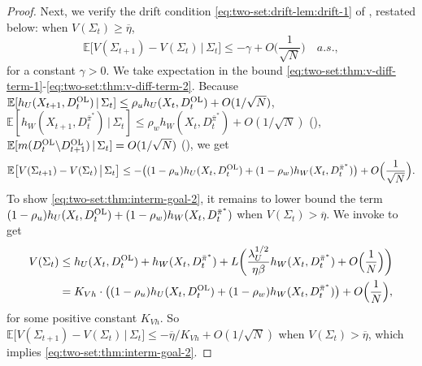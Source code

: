 \documentclass[11pt,letterpaper]{article}
\theoremstyle{plain}
\theoremstyle{definition}
\theoremstyle{remark}
\newcommand{\Eplain}[1]{\mathbb{E}[#1]}
\newcommand{\Ebig}[1]{\mathbb{E}\big[#1\big]}
\newcommand{\givenplain}{\,|\,}
\newcommand{\givenbig}{\,\big|\,}
\newcommand{\pibar}{{\sysbar{\pi}}}
\newcommand{\pibs}{{\pibar^*}}
\newcommand{\sysbar}[1]{\bar{#1}}
\newcommand{\threshbar}{\overline{\eta}}
\newcommand{\wmat}{W}
\newcommand{\umat}{U}
\newcommand{\hw}{h_\wmat}
\newcommand{\hu}{h_\umat}
\newcommand{\lamu}{\lambda_\umat}
\newcommand{\rhow}{\rho_{w}}
\newcommand{\rhou}{\rho_{u}}
\newcommand{\Da}{D^{\pibs}}
\newcommand{\Db}{D^{\textup{OL}}}
\newcommand{\Fullstate}{\Sigma}
\begin{document}
\begin{proof}
Next, we verify the drift condition \eqref{eq:two-set:drift-lem:drift-1} of , restated below: when $V(\Fullstate_t)\geq \threshbar$, 
\begin{equation}
     \label{eq:two-set:thm:interm-goal-2}
      \Ebig{V(\Fullstate_{t+1}) - V(\Fullstate_t)\givenbig \Fullstate_t} \leq -\gamma + O\Big(\frac{1}{\sqrt{N}}\Big) \quad a.s.,
\end{equation}
for a constant $\gamma > 0$. 
We take expectation in the bound \eqref{eq:two-set:thm:v-diff-term-1}-\eqref{eq:two-set:thm:v-diff-term-2}. Because
$\Eplain{\hu(X_{t+1}, \Db_t)\givenplain \Fullstate_t} \leq \rhou \hu(X_{t}, \Db_t) + O(1/\sqrt{N})$, 
$\Eplain{\hw(X_{t+1}, \Da_t)\givenplain \Fullstate_t} \leq \rhow \hw(X_{t}, \Da_t) + O(1/\sqrt{N})$ (), 
$\Eplain{m(\Db_t \backslash \Db_{t+1}) \givenplain \Fullstate_t} = O(1/\sqrt{N})$ (), we get 
\begin{equation}
    \label{eq:two-set:thm:full-drift-term-1}
     \Ebig{V(\Fullstate_{t+1}) -  V(\Fullstate_t) \givenbig \Fullstate_t} \leq - \big((1-\rhou) \hu(X_{t}, \Db_t) + (1-\rhow) \hw(X_{t}, \Da_t)\big) + O\Big(\frac{1}{\sqrt{N}}\Big). 
\end{equation}
To show \eqref{eq:two-set:thm:interm-goal-2}, it remains to lower bound the term $(1-\rhou) \hu(X_{t}, \Db_t) + (1-\rhow) \hw(X_{t}, \Da_t)$ when $V(\Fullstate_t) > \threshbar$. 
We invoke  to get
\begin{align}
    \nonumber
    V(\Fullstate_t) 
    &\leq  \hu(X_{t}, \Db_t) +  \hw(X_{t}, \Da_t) + L\bigg( \frac{\lamu^{1/2}}{\eta\beta}  \hw(X_t, \Da_t) + O\Big(\frac{1}{N}\Big)\bigg) \\
    \label{eq:v-h-bound}
    &= K_{Vh} \cdot \big((1-\rhou) \hu(X_{t}, \Db_t) + (1-\rhow) \hw(X_{t}, \Da_t)\big) + O\Big(\frac{1}{N}\Big), 
\end{align}
for some positive constant $K_{Vh}$. So $ \Ebig{V(\Fullstate_{t+1}) -  V(\Fullstate_t) \givenbig \Fullstate_t} \leq - \threshbar / K_{Vh} + O(1/\sqrt{N})$ when $V(\Fullstate_t) > \threshbar$, which implies \eqref{eq:two-set:thm:interm-goal-2}. 



\end{proof}
\end{document}
